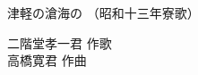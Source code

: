 \documentclass[10pt,b5j]{tarticle} %
\begin{document}
\begin{minipage}[c]{0.7\hsize} %
    \begin{center}
        {\LARGE
            津軽の滄海の %
        }
        {\small 
            （昭和十三年寮歌） %
        }
    \end{center}
\end{minipage}
\begin{minipage}[c]{0.3\hsize} %
    \begin{flushright} %
        二階堂孝一君 作歌\\高橋寛君 作曲 %
    \end{flushright}
\end{minipage}
\end{document}
